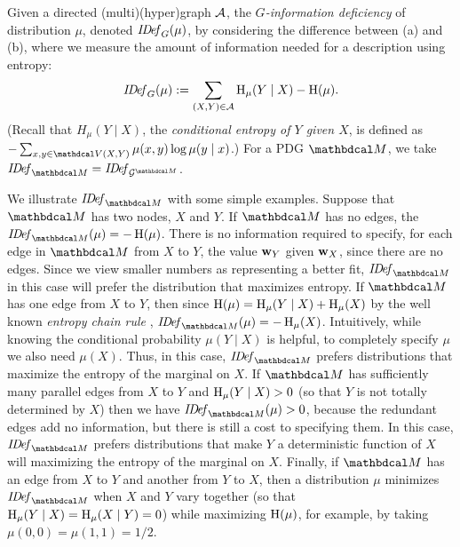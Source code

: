 \TODO[FIXME]

\begin{defn}\label{def:info-deficiency}
Given a directed (multi)(hyper)graph $\mathcal A$, 
the \emph{$G$-information deficiency}
of distribution $\mu$, denoted $\mathit{I\mskip-3.0muD\mskip-2.5mue\mskip-1.5muf}_{G}(\mu)$,
by considering the difference between (a) and (b), 
where we measure the amount of information needed for a description
using entropy: 
\begin{equation}
	\mathit{I\mskip-3.0muD\mskip-2.5mue\mskip-1.5muf}_{G}(\mu) := \sum_{(X,Y) \in \mathcal A} \operatorname{\mathrm{H}}_\mu(Y\mid X) - \operatorname{\mathrm{H}}(\mu). 
	\label{eqn:alt-extra}
\end{equation}
(Recall that $H_\mu(Y\mid X)$, the
\emph{conditional entropy of $Y$ given $X$}, is
defined as $- \sum_{x,y \in \V(X,Y)} \mu(x,y) \log \mu(y\mid x)$.)
For a PDG ${\dg M}$, we take $\IDef_{\dg M} = \IDef_{\Gr^{\dg M}}$.   
\end{defn}

We illustrate $\IDef_{\dg M}$ with some simple examples.  
Suppose that $\dg M$ has two nodes, $X$ and $Y$.  If $\dg M$ has no edges, the
$\IDef_{\dg M}(\mu) = - \H(\mu)$. There is no information required to specify, for
each edge in ${\dg M}$ from $X$ to $Y$, the value ${\mathbf w}_Y$ given ${\mathbf w}_X$, since there are no edges. Since we view smaller numbers as representing a
better fit, $\IDef_{\dg M}$ in this case will prefer the distribution that
maximizes entropy. If $\dg M$ has one edge from $X$ to $Y$, then since $\operatorname{\mathrm{H}}(\mu) =
\operatorname{\mathrm{H}}_{\mu}(Y \mid X) + \operatorname{\mathrm{H}}_\mu(X)$
by the well known \emph{entropy chain rule} \cite{mackay2003information},
$\IDef_{\dg   M}(\mu) = -\H_{\mu}(X)$. Intuitively,
while knowing the conditional probability $\mu(Y \mid X)$ is helpful, to
completely specify $\mu$ we also need $\mu(X)$. Thus, in this case, $\IDef_{\dg
M}$ prefers distributions that maximize the entropy of the marginal
on $X$. 
If $\dg M$ has sufficiently many parallel edges
 from $X$ to $Y$
 and $\operatorname{\mathrm{H}}_{\mu}(Y \mid X) > 0$ 
(so that $Y$ is not totally determined by $X$)
then we have $\IDef_{\dg M}(\mu) > 0$, because the redundant edges add no
information, but there is still a cost to specifying them.
In this case, $\IDef_{\dg M}$ prefers distributions that make $Y$ a
deterministic function of $X$ will maximizing the entropy of the
marginal on $X$.
Finally, if ${\dg M}$ has an edge from $X$ to $Y$ and another from $Y$
to $X$, then a distribution $\mu$ minimizes $\IDef_{\dg M}$ when 
$X$ and $Y$  vary together (so that $\operatorname{\mathrm{H}}_\mu(Y \mid X) = \operatorname{\mathrm{H}}_\mu(X \mid Y) = 0$)
while maximizing $\operatorname{\mathrm{H}}(\mu)$, for example, by taking $\mu(0,0)
= \mu(1,1) = 1/2$. 


